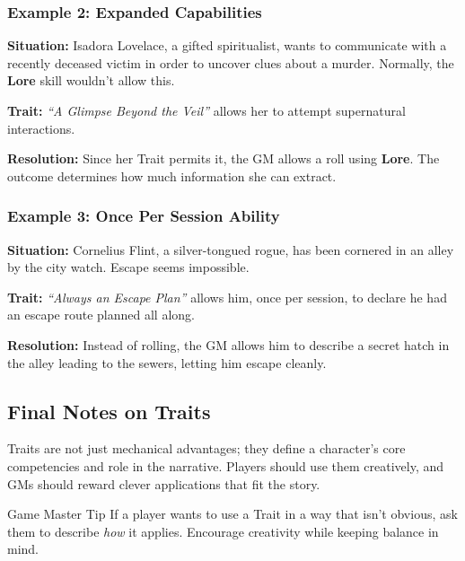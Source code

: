 \begin{DndReadAloud}{}
	\subsubsection{Example 2: Expanded Capabilities}
	\textbf{Situation:} Isadora Lovelace, a gifted spiritualist, wants to communicate with a recently deceased victim in order to uncover clues about a murder. Normally, the \textbf{Lore} skill wouldn’t allow this.

	\noindent\textbf{Trait:} \emph{“A Glimpse Beyond the Veil”} allows her to attempt supernatural interactions.

	\noindent\textbf{Resolution:} Since her Trait permits it, the GM allows a roll using \textbf{Lore}. The outcome determines how much information she can extract.
\end{DndReadAloud}


\begin{DndReadAloud}{}
	\subsubsection{Example 3: Once Per Session Ability}
	\textbf{Situation:} Cornelius Flint, a silver-tongued rogue, has been cornered in an alley by the city watch. Escape seems impossible.

	\noindent\textbf{Trait:} \emph{“Always an Escape Plan”} allows him, once per session, to declare he had an escape route planned all along.

	\noindent\textbf{Resolution:} Instead of rolling, the GM allows him to describe a secret hatch in the alley leading to the sewers, letting him escape cleanly.
\end{DndReadAloud}
 
\subsection{Final Notes on Traits}

Traits are not just mechanical advantages; they define a character’s core competencies and role in the narrative. Players should use them creatively, and GMs should reward clever applications that fit the story.

\begin{DndComment}{Game Master Tip}
 	If a player wants to use a Trait in a way that isn’t obvious, ask them to describe \emph{how} it applies. Encourage creativity while keeping balance in mind.
\end{DndComment}

